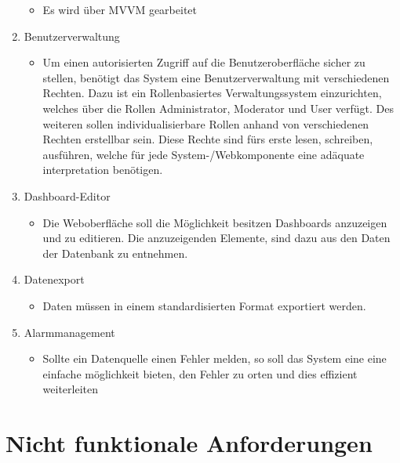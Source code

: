 \begin{enumerate}
\begin{itemize}
        \item Es wird über MVVM gearbeitet
    \end{itemize}    
    \item Benutzerverwaltung
    \begin{itemize}
        \item Um einen autorisierten Zugriff auf die Benutzeroberfläche sicher zu stellen, benötigt das System eine Benutzerverwaltung mit verschiedenen Rechten. Dazu ist ein Rollenbasiertes Verwaltungssystem einzurichten, welches über die Rollen Administrator, Moderator und User verfügt. Des weiteren sollen individualisierbare Rollen  anhand von verschiedenen Rechten erstellbar sein. Diese Rechte sind fürs erste lesen, schreiben, ausführen, welche für jede System-/Webkomponente eine adäquate interpretation benötigen. 
    \end{itemize}    
    \item Dashboard-Editor
    \begin{itemize}
        \item Die  Weboberfläche soll die Möglichkeit besitzen Dashboards anzuzeigen und zu editieren. Die anzuzeigenden Elemente, sind dazu aus den Daten der Datenbank zu entnehmen.
    \end{itemize}    
    \item Datenexport
    \begin{itemize}
        \item Daten müssen in einem standardisierten Format exportiert werden.
    \end{itemize}
    \item Alarmmanagement
    \begin{itemize}
        \item Sollte ein Datenquelle einen Fehler melden, so soll das System eine eine einfache möglichkeit bieten, den Fehler zu orten und dies effizient weiterleiten
    \end{itemize}
\end{enumerate}

\section{Nicht funktionale Anforderungen}

